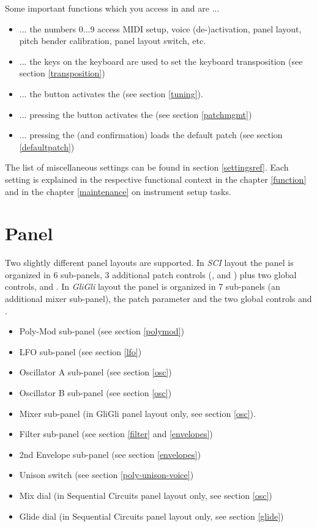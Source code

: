 \documentclass[landscape, 11pt, oneside, twoside]{report}
\newenvironment{flowtext}{\addmargin[0cm]{0cm}}{\endaddmargin} %
\begin{document}
\begin{flowtext}
Some important functions which you access in \shiftmode and \shiftlock are ...
\begin{itemize}
  \item ... the numbers 0...9 access MIDI setup, voice (de-)activation, panel layout, pitch bender calibration, panel layout switch, etc. 
  \item ... the keys on the keyboard are used to set the keyboard transposition (see section \ref{transposition}) 
  \item ... the \tune button activates the \pernote  (see section \ref{tuning}).
  \item ... pressing the \record button activates the \patchmgmt (see section \ref{patchmgmt})
  \item ... pressing the \preset (and confirmation) loads the default patch (see section \ref{defaultpatch})
\end{itemize}

The list of miscellaneous settings can be found in section \ref{settingsref}. Each setting is explained in the respective functional context in the chapter \ref{function} and in the chapter \ref{maintenance} on instrument setup tasks.

\section{Panel}\label{panel}

Two slightly different panel layouts are supported. In \textit{SCI} layout the panel is organized in 6 sub-panels, 3 additional patch controls (\unison, \mixer and \glidepot) plus two global controls, \mastertune and \mastervol. In \textit{GliGli} layout the panel is organized in 7 sub-panels (an additional mixer sub-panel), the patch parameter \unison and the two global controls \mastertune and \mastervol. 

\begin{itemize}
  \item Poly-Mod sub-panel (see section \ref{polymod})
  \item LFO sub-panel (see section \ref{lfo})
  \item Oscillator A sub-panel (see section \ref{osc})
  \item Oscillator B sub-panel (see section \ref{osc})
  \item Mixer sub-panel (in GliGli panel layout only, see section \ref{osc}).  
  \item Filter sub-panel (see section \ref{filter} and \ref{envelopes}) 
  \item 2nd Envelope sub-panel (see section \ref{envelopes})
  \item Unison switch (see section \ref{poly-unison-voice})
  \item Mix dial (in Sequential Circuits panel layout only, see section \ref{osc})
  \item Glide dial (in Sequential Circuits panel layout only, see section \ref{glide})
\end{itemize}


\end{flowtext}
\end{document}
